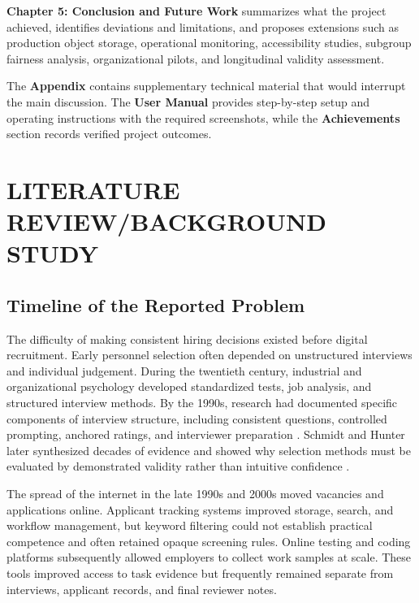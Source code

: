 \documentclass[12pt,a4paper,oneside]{report}
\renewcommand{\cite}[1]{}
\begin{document}
\textbf{Chapter 5: Conclusion and Future Work} summarizes what the project achieved,
identifies deviations and limitations, and proposes extensions such as production
object storage, operational monitoring, accessibility studies, subgroup fairness
analysis, organizational pilots, and longitudinal validity assessment.

The \textbf{Appendix} contains supplementary technical material that would interrupt
the main discussion. The \textbf{User Manual} provides step-by-step setup and operating
instructions with the required screenshots, while the \textbf{Achievements} section
records verified project outcomes.

\clearpage
\chapter{LITERATURE REVIEW/BACKGROUND STUDY}

\section{Timeline of the Reported Problem}

The difficulty of making consistent hiring decisions existed before digital
recruitment. Early personnel selection often depended on unstructured interviews and
individual judgement. During the twentieth century, industrial and organizational
psychology developed standardized tests, job analysis, and structured interview
methods. By the 1990s, research had documented specific components of interview
structure, including consistent questions, controlled prompting, anchored ratings,
and interviewer preparation \cite{campion1997}. Schmidt and Hunter later synthesized
decades of evidence and showed why selection methods must be evaluated by demonstrated
validity rather than intuitive confidence \cite{schmidt1998}.

The spread of the internet in the late 1990s and 2000s moved vacancies and
applications online. Applicant tracking systems improved storage, search, and workflow
management, but keyword filtering could not establish practical competence and often
retained opaque screening rules. Online testing and coding platforms subsequently
allowed employers to collect work samples at scale. These tools improved access to
task evidence but frequently remained separate from interviews, applicant records,
and final reviewer notes.
\end{document}
